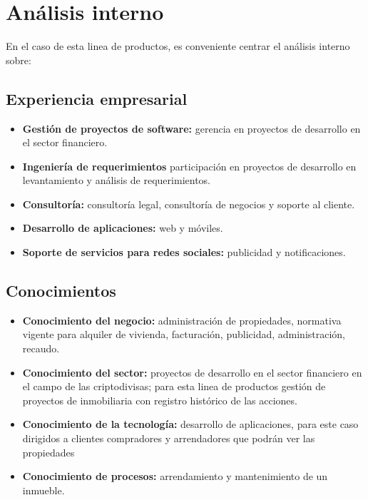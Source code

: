 \documentclass[letterpaper]{article}
\begin{document}
\newpage


\section{\textbf{Análisis interno}}

En el caso de esta linea de productos, es conveniente centrar el análisis interno sobre:

\subsection{\textbf{Experiencia empresarial}}%

\begin{itemize}
    \item \textbf{Gestión de proyectos de software:} gerencia en proyectos de desarrollo en el sector financiero.
    \item \textbf{Ingeniería de requerimientos} participación en proyectos de desarrollo en levantamiento y análisis de requerimientos.
    \item \textbf{Consultoría:} consultoría legal, consultoría de negocios y soporte al cliente.
    \item \textbf{Desarrollo de aplicaciones:}  web y móviles.
    \item \textbf{Soporte de servicios para redes sociales:} publicidad y notificaciones.
    
\end{itemize}

\subsection{\textbf{Conocimientos}}
\begin{itemize}
    \item \textbf{Conocimiento del negocio:} administración de propiedades, normativa vigente para alquiler de vivienda, facturación, publicidad, administración, recaudo.
    \item \textbf{Conocimiento del sector: } proyectos de desarrollo en el sector financiero en el campo de las criptodivisas; para esta linea de productos gestión de proyectos de inmobiliaria con registro histórico de las acciones.
    \item \textbf{Conocimiento de la tecnología:} desarrollo de aplicaciones, para este caso dirigidos a clientes compradores y arrendadores que podrán ver las propiedades 
    \item \textbf{Conocimiento de procesos: } arrendamiento y mantenimiento de un inmueble.
    
\end{itemize}   
\end{document}
